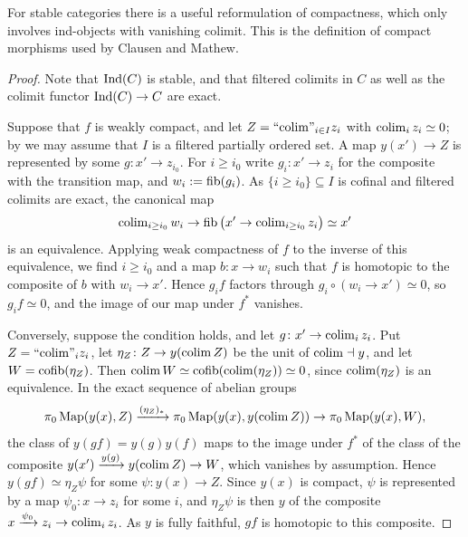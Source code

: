 	For stable categories there is a useful reformulation of compactness, which only involves ind-objects with vanishing colimit. This is the definition of compact morphisms used by Clausen and Mathew.

	\begin{proof}
		Note that $\operatorname{Ind}(C)$ is stable, and that filtered colimits in $C$ as well as the colimit functor $\operatorname{Ind}(C) \to C$ are exact.

		Suppose that $f$ is weakly compact, and let $Z = \text{``}\!\operatorname{colim}\!\text{''}_{i \in I} z_i$ with $\operatorname{colim}_i z_i \simeq 0$; by  we may assume that $I$ is a filtered partially ordered set. A map $y(x') \to Z$ is represented by some $g\colon x' \to z_{i_0}$. For $i \geq i_0$ write $g_i\colon x' \to z_i$ for the composite with the transition map, and $w_i := \operatorname{fib}(g_i)$. As $\{i \geq i_0\} \subseteq I$ is cofinal and filtered colimits are exact, the canonical map
		\[
			\operatorname{colim}_{i \geq i_0} w_i \to \operatorname{fib}\big(x' \to \operatorname{colim}_{i \geq i_0} z_i\big) \simeq x'
		\]
		is an equivalence. Applying weak compactness of $f$ to the inverse of this equivalence, we find $i \geq i_0$ and a map $b\colon x \to w_i$ such that $f$ is homotopic to the composite of $b$ with $w_i \to x'$. Hence $g_if$ factors through $g_i \circ (w_i \to x') \simeq 0$, so $g_if \simeq 0$, and the image of our map under $f^*$ vanishes.

		Conversely, suppose the condition holds, and let $g\colon x' \to \operatorname{colim}_i z_i$. Put $Z = \text{``}\!\operatorname{colim}\!\text{''}_i z_i$, let $\eta_Z\colon Z \to y(\operatorname{colim} Z)$ be the unit of $\operatorname{colim} \dashv y$, and let $W = \operatorname{cofib}(\eta_Z)$. Then $\operatorname{colim} W \simeq \operatorname{cofib}(\operatorname{colim}(\eta_Z)) \simeq 0$, since $\operatorname{colim}(\eta_Z)$ is an equivalence. In the exact sequence of abelian groups
		\[
			\pi_0\operatorname{Map}(y(x),Z) \xrightarrow{(\eta_Z)_*} \pi_0\operatorname{Map}(y(x),y(\operatorname{colim} Z)) \to \pi_0\operatorname{Map}(y(x),W),
		\]
		the class of $y(gf) = y(g)y(f)$ maps to the image under $f^*$ of the class of the composite $y(x') \xrightarrow{y(g)} y(\operatorname{colim} Z) \to W$, which vanishes by assumption. Hence $y(gf) \simeq \eta_Z\psi$ for some $\psi\colon y(x) \to Z$. Since $y(x)$ is compact, $\psi$ is represented by a map $\psi_0\colon x \to z_i$ for some $i$, and $\eta_Z\psi$ is then $y$ of the composite $x \xrightarrow{\psi_0} z_i \to \operatorname{colim}_i z_i$. As $y$ is fully faithful, $gf$ is homotopic to this composite.
	\end{proof}

